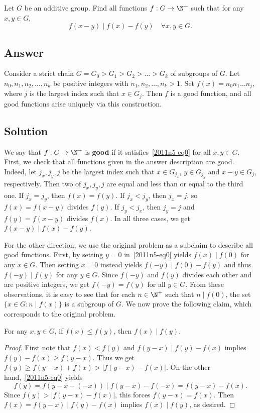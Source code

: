 Let $G$ be an additive group.
Find all functions $f : G \to \N^+$ such that for any $x, y \in G$,
\[ f(x - y) \mid f(x) - f(y) \quad \forall x, y \in G. \tag{*}\label{2011n5-eq0} \]



\subsection*{Answer}

Consider a strict chain $G = G_0 > G_1 > G_2 > \ldots > G_k$ of subgroups of $G$.
Let $n_0, n_1, n_2, \ldots, n_k$ be positive integers with $n_1, n_2, \ldots, n_k > 1$. 
Set $f(x) = n_0 n_1 \ldots n_j$, where $j$ is the largest index such that $x \in G_j$.
Then $f$ is a good function, and all good functions arise uniquely via this construction.



\subsection*{Solution}

We say that $f : G \to \N^+$ is \textbf{good} if it satisfies~\eqref{2011n5-eq0} for all $x, y \in G$.
First, we check that all functions given in the answer description are good.
Indeed, let $j_x, j_y, j$ be the largest index such that $x \in G_{j_x}$, $y \in G_{j_y}$ and $x - y \in G_j$, respectively.
Then two of $j_x, j_y, j$ are equal and less than or equal to the third one.
If $j_x = j_y$, then $f(x) = f(y)$.
If $j_x < j_y$, then $j_x = j$, so $f(x) = f(x - y)$ divides $f(y)$.
If $j_y < j_x$, then $j_y = j$ and $f(y) = f(x - y)$ divides $f(x)$.
In all three cases, we get $f(x - y) \mid f(x) - f(y)$.

For the other direction, we use the original problem as a subclaim to describe all good functions.
First, by setting $y = 0$ in~\eqref{2011n5-eq0} yields $f(x) \mid f(0)$ for any $x \in G$.
Then setting $x = 0$ instead yields $f(-y) \mid f(0) - f(y)$ and thus $f(-y) \mid f(y)$ for any $y \in G$.
Since $f(-y)$ and $f(y)$ divides each other and are positive integers, we get $f(-y) = f(y)$ for all $y \in G$.
From these observations, it is easy to see that for each $n \in \N^+$ such that $n \mid f(0)$, the set $\{x \in G : n \mid f(x)\}$ is a subgroup of $G$.
We now prove the following claim, which corresponds to the original problem.

\begin{claim}
For any $x, y \in G$, if $f(x) \leq f(y)$, then $f(x) \mid f(y)$.
\end{claim}
\begin{proof}
First note that $f(x) < f(y)$ and $f(y - x) \mid f(y) - f(x)$ implies $f(y) - f(x) \geq f(y - x)$.
Thus we get $f(y) \geq f(y - x) + f(x) > |f(y - x) - f(x)|$.
On the other hand,~\eqref{2011n5-eq0} yields
\[ f(y) = f(y - x - (-x)) \mid f(y - x) - f(-x) = f(y - x) - f(x). \]
Since $f(y) > |f(y - x) - f(x)|$, this forces $f(y - x) = f(x)$.
Then $f(x) = f(y - x) \mid f(y) - f(x)$ implies $f(x) \mid f(y)$, as desired.
\end{proof}

